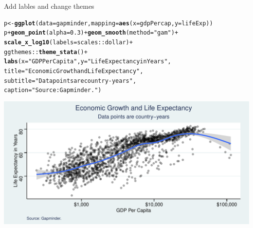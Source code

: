 \documentclass[10pt]{beamer}\usepackage[]{graphicx}\usepackage[]{color}
\makeatletter
\def\maxwidth{ %
  \ifdim\Gin@nat@width>\linewidth
    \linewidth
  \else
    \Gin@nat@width
  \fi
}
\newcommand{\hlnum}[1]{\textcolor[rgb]{0.686,0.059,0.569}{#1}}%
\newcommand{\hlstr}[1]{\textcolor[rgb]{0.192,0.494,0.8}{#1}}%
\newcommand{\hlopt}[1]{\textcolor[rgb]{0,0,0}{#1}}%
\newcommand{\hlstd}[1]{\textcolor[rgb]{0.345,0.345,0.345}{#1}}%
\newcommand{\hlkwb}[1]{\textcolor[rgb]{0.69,0.353,0.396}{#1}}%
\newcommand{\hlkwc}[1]{\textcolor[rgb]{0.333,0.667,0.333}{#1}}%
\newcommand{\hlkwd}[1]{\textcolor[rgb]{0.737,0.353,0.396}{\textbf{#1}}}%
\newenvironment{kframe}{%
 \def\at@end@of@kframe{}%
 \ifinner\ifhmode%
  \def\at@end@of@kframe{\end{minipage}}%
  \begin{minipage}{\columnwidth}%
 \fi\fi%
 \def\FrameCommand##1{\hskip\@totalleftmargin \hskip-\fboxsep
 \colorbox{shadecolor}{##1}\hskip-\fboxsep
     \hskip-\linewidth \hskip-\@totalleftmargin \hskip\columnwidth}%
 \MakeFramed {\advance\hsize-\width
   \@totalleftmargin\z@ \linewidth\hsize
   \@setminipage}}%
 {\par\unskip\endMakeFramed%
 \at@end@of@kframe}
\newenvironment{knitrout}{}{} %
\makeatother
\begin{document}
\begin{frame}[fragile]{Add lables and change themes}
\begin{knitrout}\tiny
{}\color{fgcolor}\begin{kframe}
\begin{alltt}
\hlstd{p} \hlkwb{<-} \hlkwd{ggplot}\hlstd{(}\hlkwc{data} \hlstd{= gapminder,} \hlkwc{mapping} \hlstd{=} \hlkwd{aes}\hlstd{(}\hlkwc{x} \hlstd{= gdpPercap,} \hlkwc{y}\hlstd{=lifeExp))}
\hlstd{p} \hlopt{+} \hlkwd{geom_point}\hlstd{(}\hlkwc{alpha} \hlstd{=} \hlnum{0.3}\hlstd{)} \hlopt{+} \hlkwd{geom_smooth}\hlstd{(}\hlkwc{method} \hlstd{=} \hlstr{"gam"}\hlstd{)} \hlopt{+}
    \hlkwd{scale_x_log10}\hlstd{(}\hlkwc{labels} \hlstd{= scales}\hlopt{::}\hlstd{dollar)} \hlopt{+}
    \hlstd{ggthemes}\hlopt{::}\hlkwd{theme_stata}\hlstd{()} \hlopt{+}
    \hlkwd{labs}\hlstd{(}\hlkwc{x} \hlstd{=} \hlstr{"GDP Per Capita"}\hlstd{,} \hlkwc{y} \hlstd{=} \hlstr{"Life Expectancy in Years"}\hlstd{,}
        \hlkwc{title} \hlstd{=} \hlstr{"Economic Growth and Life Expectancy"}\hlstd{,}
        \hlkwc{subtitle} \hlstd{=} \hlstr{"Data points are country-years"}\hlstd{,}
        \hlkwc{caption} \hlstd{=} \hlstr{"Source: Gapminder."}\hlstd{)}
\end{alltt}
\end{kframe}

{\centering \includegraphics[width=\maxwidth]{figure/unnamed-chunk-15-1} 

}


\end{knitrout}
\end{frame}
\end{document}
